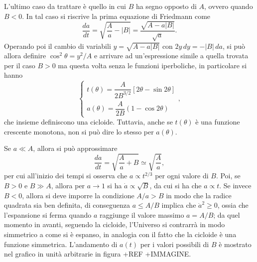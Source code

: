 L'ultimo caso da trattare è quello in cui $B$ ha segno opposto di $A$, ovvero quando $B < 0$.  In tal caso si riscrive la prima equazione di Friedmann come 
\begin{equation}
    \frac{da}{dt} = \sqrt{\frac{A}{a} - |B|} = \frac{\sqrt{A - a|B|}}{\sqrt{a}}.
\end{equation}
Operando poi il cambio di variabili $y = \sqrt{A - a|B|}$ con $2y\,dy = -|B|\,da$, si può allora definire $\cos^2{\theta} = y^2/A$ e arrivare ad un'espressione simile a quella trovata per il caso $B > 0$ ma questa volta senza le funzioni iperboliche, in particolare si hanno
\begin{equation}
    \begin{cases}
        t(\theta) = \dfrac{A}{2B^{3/2}}[2\theta - \sin{2\theta}] \\[2ex]
        a(\theta) = \dfrac{A}{2B}(1 - \cos{2\theta})
    \end{cases},
\end{equation}
che insieme definiscono una cicloide. Tuttavia, anche se $t(\theta)$ è una funzione crescente monotona, non si può dire lo stesso per $a(\theta)$. 

Se $a \ll A$, allora si può approssimare
\begin{equation}
    \frac{da}{dt} =\sqrt{\frac{A}{a} + B} \simeq \sqrt{\frac{A}{a}},
\end{equation}
per cui all'inizio dei tempi si osserva che $a \propto t^{2/3}$ per ogni valore di $B$. Poi, se $B > 0$ e $B \gg A$, allora per $a \to 1$ si ha $\dot{a} \propto \sqrt{B}$, da cui si ha che $a \propto t$. Se invece $B < 0$, allora si deve imporre la condizione $A/a > B$ in modo che la radice quadrata sia ben definita, di conseguenza $a \le A/B$ implica che $\dot{a}^2 \ge 0$, ossia che l'espansione si ferma quando $a$ raggiunge il valore massimo $a = A/B$; da quel momento in avanti, seguendo la cicloide, l'Universo si contrarrà in modo simmetrico a come si è espanso, in analogia con il fatto che la cicloide è una funzione simmetrica. L'andamento di $a(t)$ per i valori possibili di $B$ è mostrato nel grafico in unità arbitrarie in figura +REF +IMMAGINE. 

